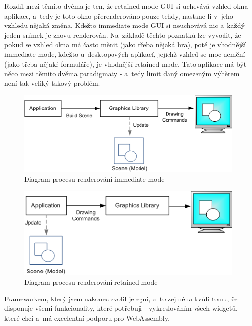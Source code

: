 \documentclass[a4paper, 12pt]{article} %
\begin{document}
        Rozdíl mezi těmito dvěma je ten, že retained mode GUI si uchovává vzhled okna aplikace, a~tedy je toto okno přerenderováno pouze tehdy, nastane-li v~jeho vzhledu nějaká změna. Kdežto immediate mode GUI si neuchovává nic a~každý jeden snímek je znovu renderován. Na~základě těchto poznatků lze vyvodit, že pokud se vzhled okna má často měnit (jako třeba nějaká hra), poté je vhodnější immediate mode, kdežto u~desktopových aplikací, jejichž vzhled se moc nemění (jako třeba nějaké formuláře), je vhodnější retained mode. Tato aplikace má být něco mezi těmito dvěma paradigmaty - a~tedy limit daný omezeným výběrem není tak veliký takový problém.
        \begin{center}
            \begin{figure}[H]
                \centering
                \includegraphics[width=.82\linewidth]{imm_mod}
                \caption{Diagram procesu renderování immediate mode\cite{imm_mod}}
                \label{fig:imm_mod}
            \end{figure}
        \end{center}
        \begin{center}
            \begin{figure}[H]
                \centering
                \includegraphics[width=.82\linewidth]{ret_mod}
                \caption{Diagram procesu renderování retained mode\cite{ret_mod}}
                \label{fig:ret_mod}
            \end{figure}
        \end{center}
        
        Frameworkem, který jsem nakonec zvolil je egui, a~to zejména kvůli tomu, že disponuje všemi funkcionality, které potřebuji - vykreslováním všech widgetů, které chci a~má excelentní podporu pro WebAssembly.\cite{egui}
    
\end{document}
